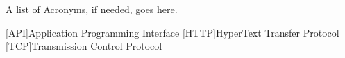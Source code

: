 %
%


A list of Acronyms, if needed, goes here.

\begin{acronym}[HTTP] %
	[API]{Application Programming Interface}
	[HTTP]{HyperText Transfer Protocol}
	[TCP]{Transmission Control Protocol}
\end{acronym}
